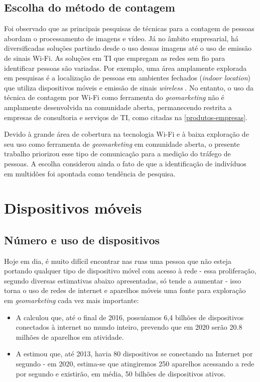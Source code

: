 \subsection{Escolha do método de contagem}
Foi observado que as principais pesquisas de técnicas para a contagem de pessoas abordam o processamento de imagens e vídeo. Já no âmbito empresarial,
há diversificadas soluções partindo desde o uso dessas imagens até o uso de emissão de sinais Wi-Fi.
As soluções em TI que empregam as redes sem fio para identificar pessoas são variadas. Por exemplo,
uma área amplamente explorada em pesquisas é a localização de pessoas em
ambientes fechados (\emph{indoor location}) que utiliza dispositivos móveis e emissão de sinais \emph{wireless} \cite{Ferreira2016}
\cite{Puhl2016} \cite{Figuera2011}. No entanto, o uso da técnica de contagem por Wi-Fi como ferramenta do \emph{geomarketing} não é amplamente desenvolvida na comunidade aberta, permanecendo restrita a empresas de consultoria e serviços de TI, como citadas na \autoref{produtos-empresas}.

Devido à grande área de cobertura na tecnologia Wi-Fi e à baixa exploração de seu uso como ferramenta de \emph{geomarketing} em comunidade aberta, o presente trabalho priorizou esse tipo de comunicação para a medição do tráfego de pessoas. A escolha considerou ainda o fato de que a identificação de indivíduos em multidões foi apontada como tendência de pesquisa.


\section{Dispositivos móveis}

\subsection{Número e uso de dispositivos}

Hoje em dia, é muito difícil encontrar nas ruas uma pessoa que não esteja portando qualquer tipo de dispositivo móvel com acesso à rede - essa proliferação, segundo diversas estimativas abaixo apresentadas, só tende a aumentar - isso torna o uso de redes de internet e aparelhos móveis uma fonte para exploração em \emph{geomarketing} cada vez mais importante: 
\begin{itemize}
\item A  calculou que, até o final de 2016, possuíamos 6,4 bilhões de dispositivos conectados à internet no mundo inteiro, prevendo que em 2020 serão 20.8 milhões de aparelhos em atividade. 
\item A  estimou que, até 2013, havia 80 dispositivos se conectando na Internet por segundo - em 2020, estima-se que atingiremos 250 aparelhos acessando a rede por segundo e existirão, em média, 50 bilhões de dispositivos ativos. 
\end{itemize}

